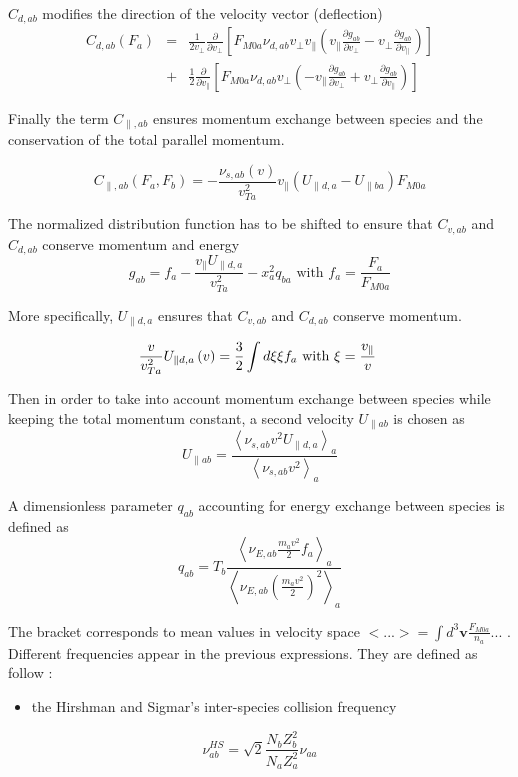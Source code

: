 \documentclass[11pt,preprint]{elsarticle}
\begin{document}
$C_{d,ab}$ modifies the direction of the velocity vector
(deflection)
\begin{eqnarray*}
C_{d,ab}\left(F_{a}\right) & = & \frac{1}{2v_{\perp}}\frac{\partial}{\partial v_{\perp}}\left[F_{M0a}\nu_{d,ab}v_{\perp}v_{\parallel}\left(v_{\parallel}\frac{\partial g_{ab}}{\partial v_{\perp}}-v_{\perp}\frac{\partial g_{ab}}{\partial v_{\parallel}}\right)\right]\\
 & + & \frac{1}{2}\frac{\partial}{\partial v_{\parallel}}\left[F_{M0a}\nu_{d,ab}v_{\perp}\left(-v_{\parallel}\frac{\partial g_{ab}}{\partial v_{\perp}}+v_{\perp}\frac{\partial g_{ab}}{\partial v_{\parallel}}\right)\right]
\end{eqnarray*}


Finally the term $C_{\parallel,ab}$ ensures momentum exchange between
species and the conservation of the total parallel momentum.

\[
C_{\parallel,ab}\left(F_{a},F_{b}\right)=-\frac{\nu_{s,ab}(v)}{v_{Ta}^{2}}v_{\parallel}\left(U_{\parallel d,a}-U_{\parallel ba}\right)F_{M0a}
\]


The normalized distribution function has to be shifted to ensure that
$C_{v,ab}$ and $C_{d,ab}$ conserve momentum and energy 
\[
g_{ab}=f_{a}-\frac{v_{\parallel}U_{\parallel d,a}}{v_{Ta}^{2}}-x_{a}^{2}q_{ba}\text{ with }\ensuremath{f_{a}=\frac{F_{a}}{F_{M0a}}}
\]


More specifically, $U_{\parallel d,a}$ ensures that $C_{v,ab}$ and
$C_{d,ab}$ conserve momentum.

\[
\frac{v}{v_{Ta}^{2}}U_{\parallel d,a}\left(v\right)=\frac{3}{2}\int d\xi\xi f_{a}\text{ with \ensuremath{\xi=\frac{v_{\parallel}}{v}} }
\]


Then in order to take into account momentum exchange between species
while keeping the total momentum constant, a second velocity $U_{\parallel ab}$
is chosen as
\[
U_{\parallel ab}=\frac{\left\langle \nu_{s,ab}v^{2}U_{\parallel d,a}\right\rangle _{a}}{\left\langle \nu_{s,ab}v^{2}\right\rangle _{a}}
\]


A dimensionless parameter $q_{ab}$ accounting for energy exchange
between species is defined as
\[
q_{ab}=T_{b}\frac{\left\langle \nu_{E,ab}\frac{m_{a}v^{2}}{2}f_{a}\right\rangle _{a}}{\left\langle \nu_{E,ab}\left(\frac{m_{a}v^{2}}{2}\right)^{2}\right\rangle _{a}}
\]


The bracket corresponds to mean values in velocity space $<...>=\int d^{3}\boldsymbol{v}\frac{F_{M0a}}{n_{a}}...$
. Different frequencies appear in the previous expressions. They are
defined as follow :
\begin{itemize}
\item the Hirshman and Sigmar's inter-species collision frequency 
\end{itemize}
\[
\nu_{ab}^{HS}=\sqrt{2}\frac{N_{b}Z_{b}^{2}}{N_{a}Z_{a}^{2}}\nu_{aa}
\]
\end{document}
